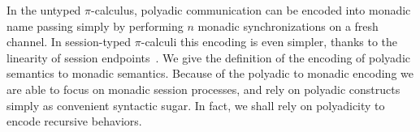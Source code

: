 In the untyped $\pi$-calculus, polyadic communication
can be encoded into monadic name passing 
simply by performing $n$ monadic synchronizations on a fresh channel. 
In session-typed $\pi$-calculi this encoding is even simpler, 
thanks to the linearity of session endpoints~\cite{VascoFun}.
We give the definition of the encoding of polyadic semantics to monadic semantics.
Because of the polyadic to monadic encoding %
we are able to focus on monadic session processes,
and rely on polyadic constructs simply as convenient syntactic sugar.
In fact, we shall rely on polyadicity to encode recursive behaviors.
%
